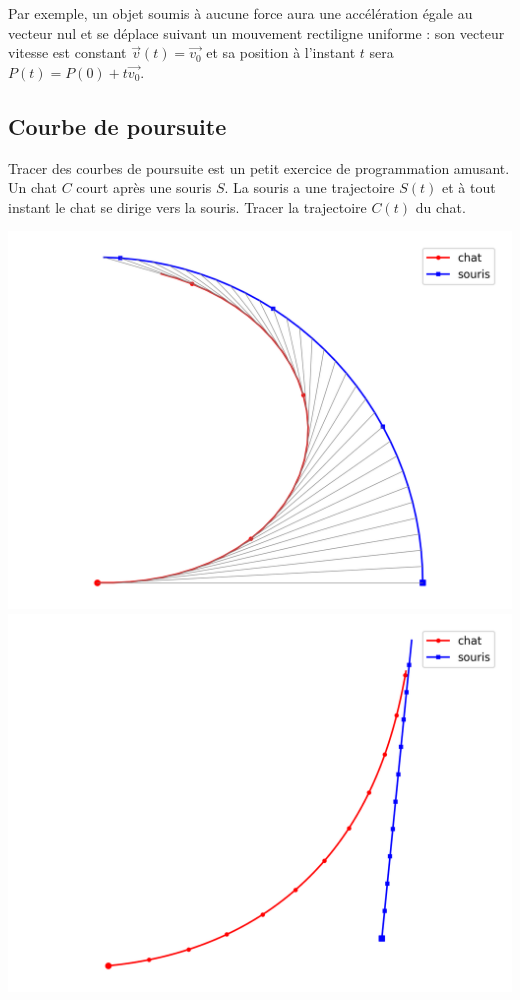 \documentclass[11pt,class=report,crop=false]{standalone}
\begin{document}
Par exemple, un objet soumis à aucune force aura une accélération égale au vecteur nul et se déplace suivant un mouvement rectiligne uniforme : son vecteur vitesse est constant $\vec v(t) = \vec{v_0}$ et sa position à l'instant $t$ sera $P(t) = P(0) + t \vec{v_0}$.


\subsection{Courbe de poursuite}

Tracer des courbes de poursuite est un petit exercice de programmation amusant.
Un chat $C$ court après une souris $S$. 
La souris a une trajectoire $S(t)$ et à tout instant le chat se dirige vers la souris. Tracer la trajectoire $C(t)$ du chat.


\begin{center}
	\includegraphics[scale=\myscale,scale=0.45]{figures/poursuite-01}\qquad\qquad
	\includegraphics[scale=\myscale,scale=0.45]{figures/poursuite-02}
\end{center}
\end{document}
